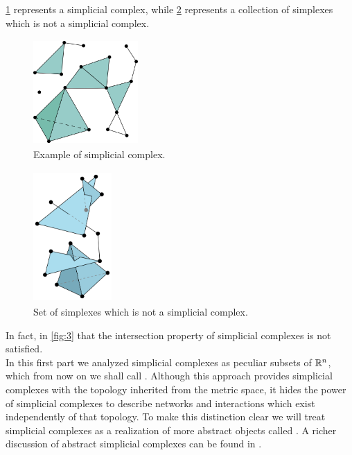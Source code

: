 \documentclass[../1.tex]{subfiles}
\begin{document}
    \ref{fig:2} represents a simplicial complex, while \ref{fig:3} represents a collection of simplexes which is not a simplicial complex. 

    
    \begin{figure}[H]
        \centering
        \includegraphics[width=4cm, height=4cm]{sections/1/complex}
        \caption{Example of simplicial complex.}
        \label{fig:2}
    \end{figure} 

    \begin{figure}[H]
        \centering
        \includegraphics[width=3cm, height=5cm]{sections/1/noncomplex}
        \caption{Set of simplexes which is not a simplicial complex.}
        \label{fig:3}
    \end{figure}

    In fact, in \autoref{fig:3} that the intersection property of simplicial complexes is not satisfied.\\

    \newpage
    In this first part we analyzed simplicial complexes as peculiar subsets of $\mathbb{R}^n$, which from now on we shall call .
    Although this approach provides simplicial complexes with the topology inherited from the metric space, it hides the power of simplicial complexes 
    to describe networks and interactions which exist independently of that topology. To make this distinction clear we will treat
    simplicial complexes as a realization of more abstract objects called . A richer discussion of abstract simplicial complexes
    can be found in \cite{rotman,comptop}.
    
\end{document}
